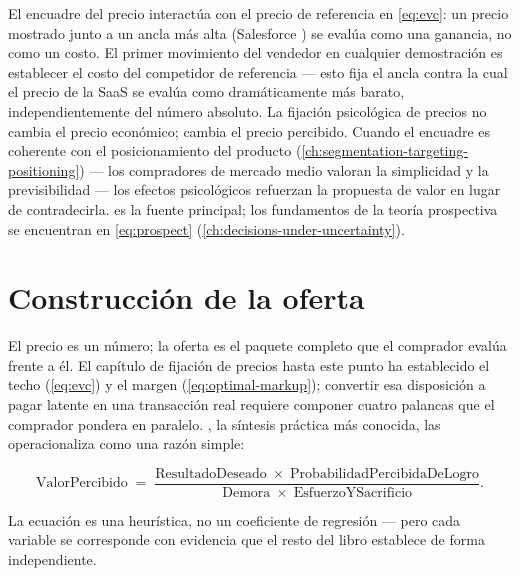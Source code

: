 El encuadre del precio interactúa con el precio de referencia en \cref{eq:evc}: un precio mostrado junto a un ancla más alta (Salesforce ) se evalúa como una ganancia, no como un costo. El primer movimiento del vendedor en cualquier demostración es establecer el costo del competidor de referencia --- esto fija el ancla contra la cual el precio de la SaaS se evalúa como dramáticamente más barato, independientemente del número absoluto. La fijación psicológica de precios no cambia el precio económico; cambia el precio percibido. Cuando el encuadre es coherente con el posicionamiento del producto (\cref{ch:segmentation-targeting-positioning}) --- los compradores de mercado medio valoran la simplicidad y la previsibilidad --- los efectos psicológicos refuerzan la propuesta de valor en lugar de contradecirla. \textcite{thaler1985mental} es la fuente principal; los fundamentos de la teoría prospectiva se encuentran en \cref{eq:prospect} (\cref{ch:decisions-under-uncertainty}).

\section{Construcción de la oferta}\label{sec:offer-construction}

El precio es un número; la oferta es el paquete completo que el comprador evalúa frente a él. El capítulo de fijación de precios hasta este punto ha establecido el techo (\cref{eq:evc}) y el margen (\cref{eq:optimal-markup}); convertir esa disposición a pagar latente en una transacción real requiere componer cuatro palancas que el comprador pondera en paralelo. \textcite{hormozi2021offers}, la síntesis práctica más conocida, las operacionaliza como una razón simple:

\begin{equation}\label{eq:value-equation}
  \mathrm{ValorPercibido}
  \;=\;
  \frac{\mathrm{ResultadoDeseado}\;\times\;\mathrm{ProbabilidadPercibidaDeLogro}}
       {\mathrm{Demora}\;\times\;\mathrm{EsfuerzoYSacrificio}}.
\end{equation}

La ecuación es una heurística, no un coeficiente de regresión --- pero cada variable se corresponde con evidencia que el resto del libro establece de forma independiente.

